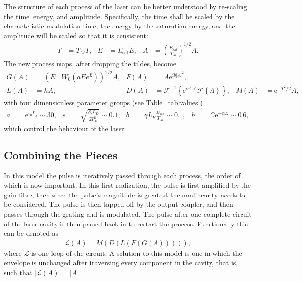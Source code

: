 \documentclass[12pt]{article}
\newcommand{\Es}{E_{\textrm{sat}}}
\newcommand{\FT}[1]{\mathcal{F}\left\{ #1 \right\}}
\newcommand{\FTi}[1]{\mathcal{F}^{-1}\left\{ #1 \right\}}
\begin{document}
The structure of each process of the laser can be better understood by re-scaling the time, energy, and amplitude. Specifically, the time shall be scaled by the characteristic modulation time, the energy by the saturation energy, and the amplitude will be scaled so that it is consistent:
\begin{align*}
	T &= T_M \widetilde{T},& E &= \Es \widetilde{E},& A &= \left( \frac{\Es}{T_M} \right)^{1/2} \widetilde{A}.
\end{align*}
The new process maps, after dropping the tildes, become
\begin{align*}
	G(A) &= \left(E^{-1} W_0 \left( a E e^{E}\right) \right)^{1/2} A,&
	F(A) &= A \textrm{e}^{i b |A|^2}, \\
	L(A) &= h A,&
	D(A) &= \FTi{\textrm{e}^{i s^2 \omega^2} \FT{A}},&
	M(A) &= \textrm{e}^{-T^2 / 2} A,
\end{align*}
with four dimensionless parameter groups (see Table~\ref{tab:values})
\begin{align*}
	a &= \textrm{e}^{g_0 L_g} \sim 30,& s &= \sqrt{\frac{\beta_2 L_D}{2 T_M^2}} \sim 0.1,&
	b &= \gamma L_F \frac{\Es}{T_M} \sim 0.1,& h &= C \textrm{e}^{-\alpha L} \sim 0.6,
\end{align*}
which control the behaviour of the laser.

\subsection{Combining the Pieces}
In this model the pulse is iteratively passed through each process, the order of which is now important. In this first realization, the pulse is first amplified by the gain fibre, then since the pulse's magnitude is greatest the nonlinearity needs to be considered. The pulse is then tapped off by the output coupler, and then passes through the grating and is modulated. The pulse after one complete circuit of the laser cavity is then passed back in to restart the process. Functionally this can be denoted as
\begin{align*}
	\mathcal{L}(A) = M(D(L(F(G(A))))),
\end{align*}
where $\mathcal{L}$ is one loop of the circuit. A solution to this model is one in which the envelope is unchanged after traversing every component in the cavity, that is, such that $|\mathcal{L}(A)| = |A|$.
\end{document}
